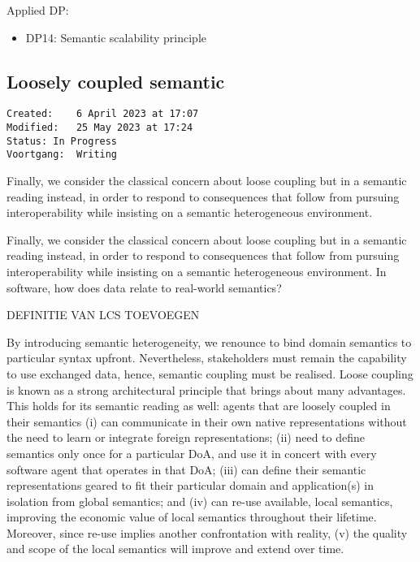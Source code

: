 \documentclass[sort&compress,preprint,3p,authoryear,twocolumn]{elsarticle}
\providecommand{\tightlist}{%
  \setlength{\itemsep}{0pt}\setlength{\parskip}{0pt}}
\theoremstyle{break}			%
\begin{document}
Applied DP:

\begin{itemize}
\tightlist
\item
  DP14: Semantic scalability principle
\end{itemize}

\subsection{Loosely coupled semantic}\label{loosely-coupled-semantic}

\begin{verbatim}
Created:    6 April 2023 at 17:07
Modified:   25 May 2023 at 17:24
Status: In Progress
Voortgang:  Writing
\end{verbatim}

Finally, we consider the classical concern about loose coupling but in a
semantic reading instead, in order to respond to consequences that
follow from pursuing interoperability while insisting on a semantic
heterogeneous environment.

Finally, we consider the classical concern about loose coupling but in a
semantic reading instead, in order to respond to consequences that
follow from pursuing interoperability while insisting on a semantic
heterogeneous environment. In software, how does data relate to
real-world semantics?

DEFINITIE VAN LCS TOEVOEGEN

By introducing semantic heterogeneity, we renounce to bind domain
semantics to particular syntax upfront. Nevertheless, stakeholders must
remain the capability to use exchanged data, hence, semantic coupling
must be realised. Loose coupling is known as a strong architectural
principle that brings about many advantages. This holds for its semantic
reading as well: agents that are loosely coupled in their semantics (i)
can communicate in their own native representations without the need to
learn or integrate foreign representations; (ii) need to define
semantics only once for a particular DoA, and use it in concert with
every software agent that operates in that DoA; (iii) can define their
semantic representations geared to fit their particular domain and
application(s) in isolation from global semantics; and (iv) can re-use
available, local semantics, improving the economic value of local
semantics throughout their lifetime. Moreover, since re-use implies
another confrontation with reality, (v) the quality and scope of the
local semantics will improve and extend over time.
\end{document}
